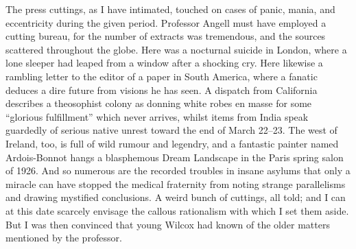 The press cuttings, as I have intimated, touched on cases of panic,
mania, and eccentricity during the given period. Professor Angell must
have employed a cutting bureau, for the number of extracts was
tremendous, and the sources scattered throughout the globe. Here was a
nocturnal suicide in London, where a lone sleeper had leaped from a
window after a shocking cry. Here likewise a rambling letter to the
editor of a paper in South America, where a fanatic deduces a dire
future from visions he has seen. A dispatch from California describes a
theosophist colony as donning white robes en masse for some ``glorious
fulfillment'' which never arrives, whilst items from India speak
guardedly of serious native unrest toward the end of March 22--23.
The west of Ireland, too, is full of wild rumour and legendry, and a
fantastic painter named Ardois-Bonnot hangs a blasphemous Dream
Landscape in the Paris spring salon of 1926. And so numerous are the
recorded troubles in insane asylums that only a miracle can have stopped
the medical fraternity from noting strange parallelisms and drawing
mystified conclusions. A weird bunch of cuttings, all told; and I can at
this date scarcely envisage the callous rationalism with which I set
them aside. But I was then convinced that young Wilcox had known of the
older matters mentioned by the professor.

